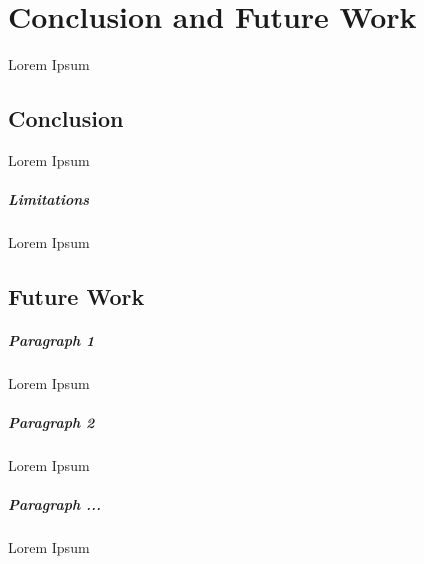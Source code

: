 

\chapter{Conclusion and Future Work}
\label{ch:conclusion_future_work}

Lorem Ipsum


\section{Conclusion}
\label{sec:conclustion}

Lorem Ipsum

\paragraph{Limitations} Lorem Ipsum




\section{Future Work}
\label{sec:future_work}

\paragraph{Paragraph 1} Lorem Ipsum

\paragraph{Paragraph 2} Lorem Ipsum

\paragraph{Paragraph ...} Lorem Ipsum





